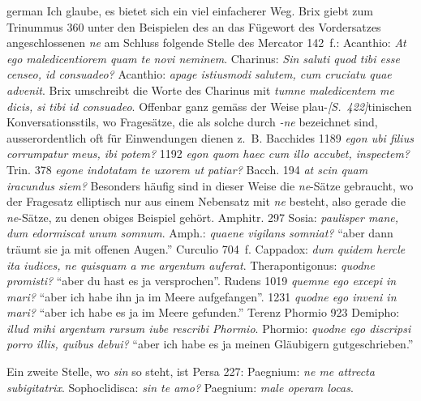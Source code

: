 \begin{otherlanguage*}{german}
Ich glaube, es bietet sich ein viel einfacherer Weg. Brix giebt zum Trinummus 360 unter den Beispielen des an das Fügewort des Vordersatzes angeschlossenen \emph{ne} am Schluss folgende Stelle des Mercator 142~f.: Acanthio: \emph{At ego maledicentiorem quam te novi neminem}. Charinus: \emph{Sin saluti quod tibi esse censeo, id consuadeo?} Acanthio: \emph{apage istiusmodi salutem, cum cruciatu quae advenit}. Brix umschreibt die Worte des Charinus mit \emph{tumne maledicentem me dicis, si tibi id consuadeo}. Offenbar ganz gemäss der Weise plau-\hypertarget{p422}{\emph{[S.~422]}}\label{p422}tinischen Konversationsstils, wo Fragesätze, die als solche durch \emph{-ne} bezeichnet sind, ausserordentlich oft für Einwendungen dienen z.~B. Bacchides 1189 \emph{egon ubi filius corrumpatur meus, ibi potem?} 1192 \emph{egon quom haec cum illo accubet, inspectem?} Trin. 378 \emph{egone indotatam te uxorem ut patiar?} Bacch. 194 \emph{at scin quam iracundus siem?} Besonders häufig sind in dieser Weise die \emph{ne}-Sätze gebraucht, wo der Fragesatz elliptisch nur aus einem Nebensatz mit \emph{ne} besteht, also gerade die \emph{ne}-Sätze, zu denen obiges Beispiel gehört. Amphitr. 297 Sosia: \emph{paulisper mane, dum edormiscat unum somnum}. Amph.: \emph{quaene vigilans somniat?} “aber dann träumt sie ja mit offenen Augen.” Curculio 704~f. Cappadox: \emph{dum quidem hercle ita iudices, ne quisquam a me argentum auferat}. Therapontigonus: \emph{quodne promisti?} “aber du hast es ja versprochen”. Rudens 1019 \emph{quemne ego excepi in mari?} “aber ich habe ihn ja im Meere aufgefangen”. 1231 \emph{quodne ego inveni in mari?} “aber ich habe es ja im Meere gefunden.” Terenz Phormio 923 Demipho: \emph{illud mihi argentum rursum iube rescribi Phormio}. Phormio: \emph{quodne ego discripsi porro illis, quibus debui?} “aber ich habe es ja meinen Gläubigern gutgeschrieben.”

Ein zweite Stelle, wo \emph{sin} so steht, ist Persa 227: Paegnium: \emph{ne me attrecta subigitatrix}. Sophoclidisca: \emph{sin te amo?} Paegnium: \emph{male operam locas}.


\end{otherlanguage*}
